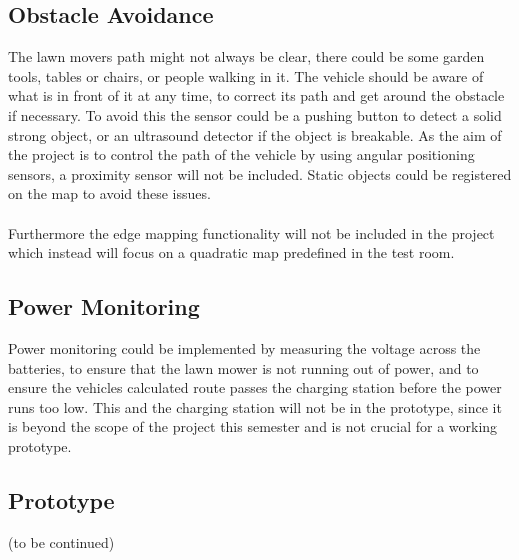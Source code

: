 \subsection{Obstacle Avoidance}
The lawn movers path might not always be clear, there could be some garden tools, tables or chairs, or people walking in it. The vehicle should be aware of what is in front of it at any time, to correct its path and get around the obstacle if necessary. To avoid this the sensor could be a pushing button to detect a solid strong object, or an ultrasound detector if the object is breakable.
As the aim of the project is to control the path of the vehicle by using angular positioning sensors, a proximity sensor will not be included. Static objects could be registered on the map to avoid these issues.\\\\
Furthermore the edge mapping functionality will not be included in the project which instead will focus on a quadratic map predefined in the test room.

\subsection{Power Monitoring}
Power monitoring could be implemented by measuring the voltage across the batteries, to ensure that the lawn mower is not running out of power, and to ensure the vehicles calculated route passes the charging station before the power runs too low.
This and the charging station will not be in the prototype, since it is beyond the scope of the project this semester and is not crucial for a working prototype.

\subsection{Prototype}
(to be continued)

